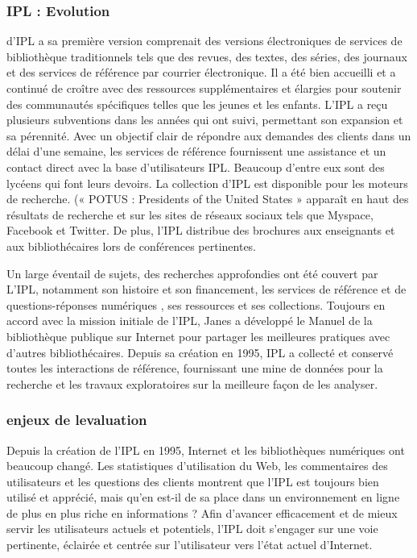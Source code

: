 \documentclass[french,a4paper,12pt]{article}
\begin{document}
\subsubsection{ IPL : Evolution}

\quad d'IPL a  sa première version comprenait des versions électroniques de services de bibliothèque traditionnels tels que des revues, des textes, des séries, des journaux et des services de référence par courrier électronique. Il a été bien accueilli et a continué de croître avec des ressources supplémentaires et élargies pour soutenir des communautés spécifiques telles que les jeunes et les enfants. L'IPL a reçu plusieurs subventions dans les années qui ont suivi, permettant son expansion et sa pérennité. Avec un objectif clair de répondre aux demandes des clients dans un délai d'une semaine, les services de référence fournissent une assistance et un contact direct avec la base d'utilisateurs IPL. Beaucoup d'entre eux sont des lycéens qui font leurs devoirs. La collection d'IPL est disponible pour les moteurs de recherche.  (« POTUS : Presidents of the United States » apparaît en haut des résultats de recherche et sur les sites de réseaux sociaux tels que Myspace, Facebook et Twitter. De plus, l'IPL distribue des brochures aux enseignants et aux bibliothécaires lors de conférences pertinentes.

\quad  Un large éventail de sujets, des recherches approfondies ont été couvert par  L'IPL, notamment son histoire et son financement, les services de référence et de questions-réponses numériques , ses ressources et ses collections. Toujours en accord avec la mission initiale de l'IPL, Janes a développé le Manuel de la bibliothèque publique sur Internet pour partager les meilleures pratiques avec d'autres bibliothécaires. Depuis sa création en 1995, IPL a collecté et conservé toutes les interactions de référence, fournissant une mine de données pour la recherche et les travaux exploratoires sur la meilleure façon de les analyser.

\subsubsection{ enjeux de levaluation}

\quad Depuis la création de l'IPL en 1995, Internet et les bibliothèques numériques ont beaucoup changé. Les statistiques d'utilisation du Web, les commentaires des utilisateurs et les questions des clients montrent que l'IPL est toujours bien utilisé et apprécié, mais qu'en est-il de sa place dans un environnement en ligne de plus en plus riche en informations ?  Afin d'avancer efficacement et de mieux servir les utilisateurs actuels et potentiels, l'IPL doit s'engager sur une voie pertinente, éclairée et centrée sur l'utilisateur vers l'état actuel d'Internet.
\end{document}
